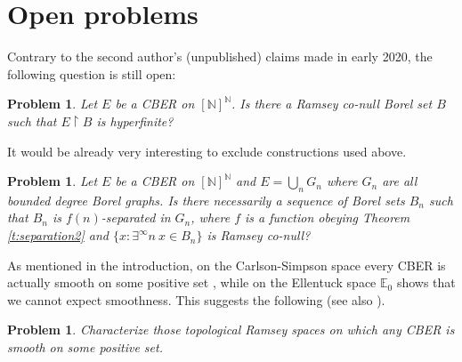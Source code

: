 \documentclass[11pt]{amsart}
\newcommand{\N}{\mathbb{N}}
\renewcommand{\restriction}[2]{#1 \upharpoonright #2}
\newtheorem{problem}[theorem]{Problem}
\theoremstyle{definition}
\numberwithin{equation}{section}
\begin{document}
	\section{Open problems}
	\label{s:problems}
	Contrary to the second author's (unpublished) claims made in early 2020, the following question is still open:
	\begin{problem}
		Let $E$ be a CBER on $[\N]^\N$. Is there a Ramsey co-null Borel set $B$ such that $\restriction{E}{B}$ is hyperfinite?
  	\end{problem}
  	It would be already very interesting to exclude constructions used above.
  	  	
	\begin{problem}
		Let $E$ be a CBER on $[\N]^\N$ and $E=\bigcup_n G_n$ where $G_n$ are all bounded degree Borel graphs. Is there necessarily a sequence of Borel sets $B_n$ such that $B_n$ is $f(n)$-separated in $G_n$, where $f$ is a function obeying Theorem \ref{t:separation2} and $\{x:\exists^\infty n \ x \in B_n\}$ is Ramsey co-null?
	\end{problem}
	
	
	
	As mentioned in the introduction, on the Carlson-Simpson space every CBER is actually smooth on some positive set \cite{panagiotopoulos2022every}, while on the Ellentuck space $\mathbb{E}_0$ shows that we cannot expect smoothness. This suggests the following (see also \cite{panagiotopoulos2022every}).

    \begin{problem}
        Characterize those topological Ramsey spaces on which any CBER is smooth on some positive set.
    \end{problem}

    
	
	
	
	
\end{document}
